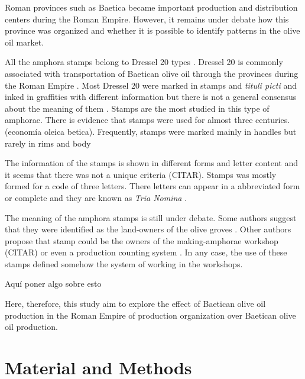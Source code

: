 \documentclass[review]{elsarticle}
\begin{document}
Roman provinces such as Baetica became important production and distribution centers during the Roman Empire. However, it remains under debate how this province was organized and whether it is possible to identify patterns in the olive oil market. 




All the amphora stamps belong to Dressel 20 types \citep{dressel,martin-kilcher_romischen_1994}. Dressel 20 is commonly associated with transportation of Baetican olive oil through the provinces during the Roman Empire \citep{berni_millet_epigrafianforica_2008}. Most Dressel 20 were marked in stamps and \textit{tituli picti} and inked in graffities with different information but there is not a general consensus about the meaning of them \citep{rodriguez_baetican_1998}. Stamps are the most studied in this type of amphorae. There is evidence that stamps were used for almost three centuries. (economía oleica betica). Frequently, stamps were marked mainly in handles but rarely in rims and body \citep{millet_anforas_1998}

The information of the stamps is shown in different forms and letter content and it seems that there was not a unique criteria (CITAR). Stamps was mostly formed for a code of three letters. There letters can appear in a abbreviated form or complete and they are known as \textit{Tria Nomina} \citep{berni_millet_amphora_1996}. 


The meaning of the amphora stamps is still under debate. Some authors suggest that they were identified as the land-owners of the olive groves \citep{rodriguez_economioleicola_1977}. Other authors propose that stamp could be the owners of the making-amphorae workshop (CITAR) or even a production counting system \citep{berni_millet_epigrafianforica_2008}. In any case, the use of these stamps defined somehow the system of working in the workshops. 

Aquí poner algo sobre esto \citep{remesal_anforas_2004}

Here, therefore, this study aim to explore the effect of Baetican olive oil production in the Roman Empire
of production organization over Baetican olive oil production. 


\section{Material and Methods}
\end{document}
